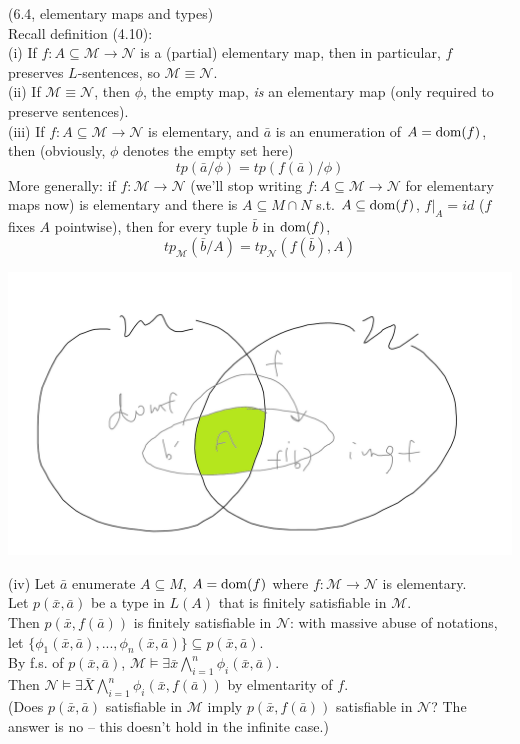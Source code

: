 \documentclass[a4paper]{article}
\begin{document}
\begin{fact} (6.4, elementary maps and types)\\
    Recall definition (4.10):\\
    (i) If $f:A \subseteq \mathcal{M} \to \mathcal{N}$ is a (partial) elementary map, then in particular, $f$ preserves $L$-sentences, so $\mathcal{M} \equiv \mathcal{N}$.\\
    (ii) If $\mathcal{M} \equiv \mathcal{N}$, then $\phi$, the empty map, \emph{is} an elementary map (only required to preserve sentences).\\
    (iii) If $f:A \subseteq \mathcal{M} \to \mathcal{N}$ is elementary, and $\bar{a}$ is an enumeration of $A=\operatorname{dom}(f)$, then (obviously, $\phi$ denotes the empty set here)
    $$tp(\bar{a}/\phi) = tp(f(\bar{a})/\phi)$$
    More generally: if $f:\mathcal{M} \to \mathcal{N}$ (we'll stop writing $f:A \subseteq \mathcal{M} \to \mathcal{N}$ for elementary maps now) is elementary and there is $A\subseteq M \cap N$ s.t. $A \subseteq \operatorname{dom}(f)$, $f|_A = id$ ($f$ fixes $A$ pointwise), then for every tuple $\bar{b}$ in $\operatorname{dom}(f)$,
    $$tp_\mathcal{M} (\bar{b}/A) = tp_\mathcal{N} (f(\bar{b}),A)$$

    \includegraphics[scale=0.5]{image/Model_08.png}

    (iv) Let $\bar{a}$ enumerate $A \subseteq M$, $A=\operatorname{dom}(f)$ where $f:\mathcal{M} \to \mathcal{N}$ is elementary.\\
    Let $p(\bar{x},\bar{a})$ be a type in $L(A)$ that is finitely satisfiable in $\mathcal{M}$.\\
    Then $p(\bar{x},f(\bar{a}))$ is finitely satisfiable in $\mathcal{N}$: with massive abuse of notations, let $\{\phi_1(\bar{x},\bar{a}),...,\phi_n(\bar{x},\bar{a})\} \subseteq p(\bar{x},\bar{a})$.\\
    By f.s. of $p(\bar{x},\bar{a})$, $\mathcal{M} \vDash \exists \bar{x} \bigwedge_{i=1}^n \phi_i(\bar{x},\bar{a})$.\\
    Then $\mathcal{N} \vDash \exists \bar{X} \bigwedge_{i=1}^n \phi_i(\bar{x},f(\bar{a}))$ by elmentarity of $f$.\\
    (Does $p(\bar{x},\bar{a})$ satisfiable in $\mathcal{M}$ imply $p(\bar{x},f(\bar{a}))$ satisfiable in $\mathcal{N}$? The answer is no -- this doesn't hold in the infinite case.)
\end{fact}
\end{document}
